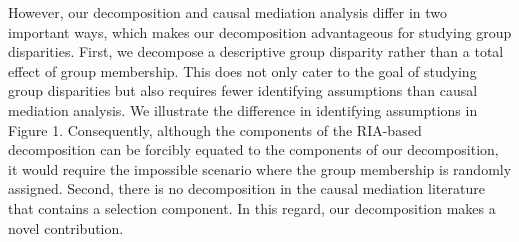 \documentclass[12pt,a4paper]{article}
\begin{document}
However, our decomposition and causal mediation analysis differ in two important ways, which makes our decomposition advantageous for studying group disparities. First, we decompose a descriptive group disparity rather than a total effect of group membership. This does not only  cater to the goal of studying group disparities but also requires fewer identifying assumptions than causal mediation analysis. We illustrate the difference in identifying assumptions in Figure 1. Consequently, although the components of the RIA-based decomposition can be forcibly equated to the components of our decomposition, it would require the impossible scenario where the group membership is randomly assigned.
Second, there is no decomposition in the causal mediation literature that contains a selection component. In this regard, our decomposition makes a novel contribution.
\end{document}
